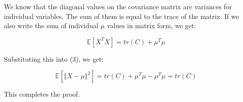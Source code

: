 \documentclass[10pt,letterpaper]{article}
\begin{document}
We know that the diagonal values on the covariance matrix are variances for individual variables. The sum of them is equal to the trace of the matrix. If we also write the sum of individual $\mu$ values in matrix form, we get: 

    \begin{equation}
       \mathbb{E}[X^TX] = tr(C) + \mu^T\mu
    \end{equation}

Substituting this into (3), we get:

    \begin{equation}
       \mathbb{E}[\left \Vert X-\mu \right \Vert ^2] = 
       tr(C) + \mu^T\mu- \mu^T\mu = tr(C)
    \end{equation}

This completes the proof. 
\end{document}
